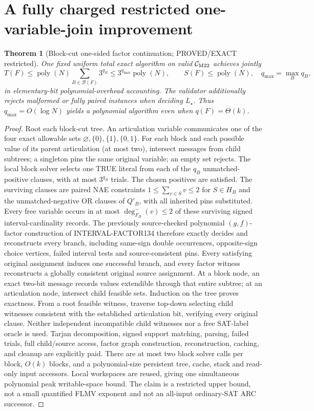 \documentclass[11pt]{article}
\newtheorem{theorem}{Theorem}
\begin{document}
\section{A fully charged restricted one-variable-join improvement}
\begin{theorem}[Block-cut one-sided factor continuation; PROVED/EXACT restricted]
One fixed uniform total exact algorithm on valid $\mathcal C_{\rm M22}$ achieves jointly
\[
T(F)\le\operatorname{poly}(N)\sum_{B\in\mathcal B(F)}3^{q_B}
\le 3^{q_{\max}}\operatorname{poly}(N),\qquad
S(F)\le\operatorname{poly}(N),\quad q_{\max}=\max_Bq_B,
\]
in elementary-bit polynomial-overhead accounting. The validator additionally rejects malformed or fully paired instances when deciding $L_\star$. Thus $q_{\max}=O(\log N)$ yields a polynomial algorithm even when $q(F)=\Theta(k)$.
\end{theorem}
\begin{proof}
Root each block-cut tree. An articulation variable communicates one of the four exact allowable sets $\varnothing,\{0\},\{1\},\{0,1\}$. For each block and each possible value of its parent articulation (at most two), intersect messages from child subtrees; a singleton pins the same original variable; an empty set rejects. The local block solver selects one TRUE literal from each of the $q_B$ unmatched-positive clauses, with at most $3^{q_B}$ trials. The chosen positives are satisfied. The surviving clauses are paired NAE constraints $1\le\sum_{v\in S}v\le2$ for $S\in H_B$ and the unmatched-negative OR clauses of $Q'_B$, with all inherited pins substituted. Every free variable occurs in at most $\deg^-_{F_B}(v)\le2$ of these surviving signed interval-cardinality records. The previously source-checked polynomial $(g,f)$-factor construction of INTERVAL-FACTOR134 therefore exactly decides and reconstructs every branch, including same-sign double occurrences, opposite-sign choice vertices, failed interval tests and source-consistent pins. Every satisfying original assignment induces one successful branch, and every factor witness reconstructs a globally consistent original source assignment.
At a block node, an exact two-bit message records values extendible through that entire subtree; at an articulation node, intersect child feasible sets. Induction on the tree proves exactness. From a root feasible witness, traverse top-down selecting child witnesses consistent with the established articulation bit, verifying every original clause. Neither independent incompatible child witnesses nor a free SAT-label oracle is used. Tarjan decomposition, signed support matching, parsing, failed trials, full child/source access, factor graph construction, reconstruction, caching, and cleanup are explicitly paid. There are at most two block solver calls per block, $O(k)$ blocks, and a polynomial-size persistent tree, cache, stack and read-only input accessors. Local workspaces are reused, giving one simultaneous polynomial peak writable-space bound. The claim is a restricted upper bound, not a small quantified FLMV exponent and not an all-input ordinary-SAT ARC successor.
\end{proof}
\end{document}
